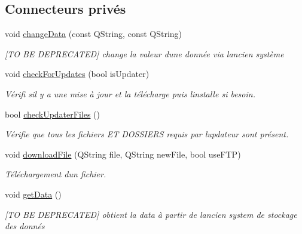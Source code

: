 \subsection*{Connecteurs privés}
\begin{DoxyCompactItemize}
\item 
\mbox{\label{classmainWindow_aeaaa3e081622166a8ca0514b3eb3ef8a}} 
void \hyperlink{classmainWindow_aeaaa3e081622166a8ca0514b3eb3ef8a}{change\+Data} (const Q\+String, const Q\+String)
\begin{DoxyCompactList}\small\item\em \mbox{[}TO BE D\+E\+P\+R\+E\+C\+A\+T\+ED\mbox{]} change la valeur d\textquotesingle{}une donnée via l\textquotesingle{}ancien système \end{DoxyCompactList}\item 
void \hyperlink{classmainWindow_a52d5ce0b17a87a34ac1038508e3a5c45}{check\+For\+Updates} (bool is\+Updater)
\begin{DoxyCompactList}\small\item\em Vérifi s\textquotesingle{}il y a une mise à jour et la télécharge puis l\textquotesingle{}installe si besoin. \end{DoxyCompactList}\item 
bool \hyperlink{classmainWindow_ae7ec250c3c2ec4dbc0aeae77eb546e1b}{check\+Updater\+Files} ()
\begin{DoxyCompactList}\small\item\em Vérifie que tous les fichiers ET D\+O\+S\+S\+I\+E\+RS requis par l\textquotesingle{}updateur sont présent. \end{DoxyCompactList}\item 
void \hyperlink{classmainWindow_a9f87acf49e48db90c3c8117bb99682b3}{download\+File} (Q\+String file, Q\+String new\+File, bool use\+F\+TP)
\begin{DoxyCompactList}\small\item\em Téléchargement d\textquotesingle{}un fichier. \end{DoxyCompactList}\item 
\mbox{\label{classmainWindow_a63e4aea9eb9a73812933b509b20b82e5}} 
void \hyperlink{classmainWindow_a63e4aea9eb9a73812933b509b20b82e5}{get\+Data} ()
\begin{DoxyCompactList}\small\item\em \mbox{[}TO BE D\+E\+P\+R\+E\+C\+A\+T\+ED\mbox{]} obtient la data à partir de l\textquotesingle{}ancien system de stockage des donnés \end{DoxyCompactList}\item 

\end{DoxyCompactItemize}

